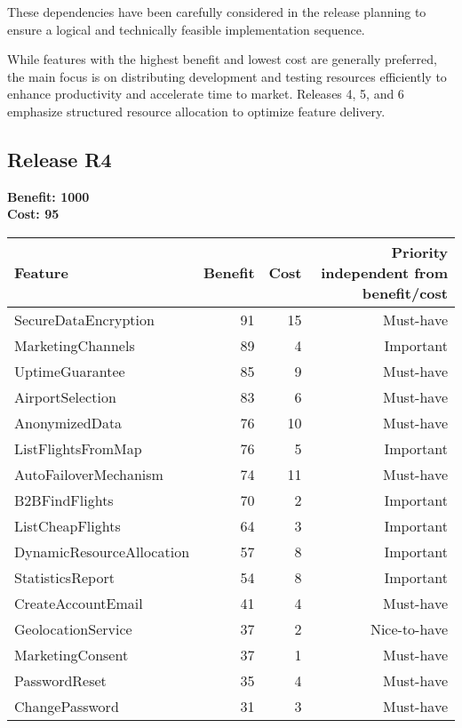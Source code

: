These dependencies have been carefully considered in the release planning to ensure a logical and technically feasible implementation sequence.

While features with the highest benefit and lowest cost are generally preferred, the main focus is on distributing development and testing resources efficiently to enhance productivity and accelerate time to market. Releases 4, 5, and 6 emphasize structured resource allocation to optimize feature delivery.


\subsection{Release R4}
\textbf{Benefit: 1000} \\
\textbf{Cost: 95} \\

\begin{tabular}{lrrr}
\toprule
\textbf{Feature} & \textbf{Benefit} & \textbf{Cost} & \textbf{Priority} independent from benefit/cost \\
\midrule
SecureDataEncryption & 91 & 15 & Must-have \\
MarketingChannels & 89 & 4 & Important \\
UptimeGuarantee & 85 & 9 & Must-have \\
AirportSelection & 83 & 6 & Must-have \\
AnonymizedData & 76 & 10 & Must-have \\
ListFlightsFromMap & 76 & 5 & Important \\
AutoFailoverMechanism & 74 & 11 & Must-have \\
B2BFindFlights & 70 & 2 & Important \\
ListCheapFlights & 64 & 3 & Important \\
DynamicResourceAllocation & 57 & 8 & Important \\
StatisticsReport & 54 & 8 & Important \\
CreateAccountEmail & 41 & 4 & Must-have \\
GeolocationService & 37 & 2 & Nice-to-have \\
MarketingConsent & 37 & 1 & Must-have \\
PasswordReset & 35 & 4 & Must-have \\
ChangePassword & 31 & 3 & Must-have \\
\bottomrule 
\end{tabular}

